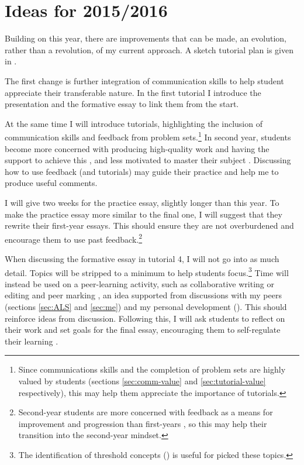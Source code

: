 \section{Ideas for 2015/2016}\label{sec:future}

Building on this year, there are improvements that can be made, an evolution, rather than a revolution, of my current approach. A sketch tutorial plan is given in .

The first change is further integration of communication skills to help student appreciate their transferable nature. In the first tutorial I introduce the presentation and the formative essay to link them from the start.

At the same time I will introduce tutorials, highlighting the inclusion of communication skills and feedback from problem sets.\footnote{Since communications skills and the completion of problem sets are highly valued by students (sections \ref{sec:comm-value} and \ref{sec:tutorial-value} respectively), this may help them appreciate the importance of tutorials.} In second year, students become more concerned with producing high-quality work and having the support to achieve this \citep{Zaitseva2013}, and less motivated to master their subject \citep{Lieberman2007}. Discussing how to use feedback (and tutorials) may guide their practice and help me to produce useful comments.

I will give two weeks for the practice essay, slightly longer than this year. To make the practice essay more similar to the final one, I will suggest that they rewrite their first-year essays. This should ensure they are not overburdened and encourage them to use past feedback.\footnote{Second-year students are more concerned with feedback as a means for improvement and progression than first-years \citep{Zaitseva2013}, so this may help their transition into the second-year mindset.}

When discussing the formative essay in tutorial 4, I will not go into as much detail. Topics will be stripped to a minimum to help students focus.\footnote{The identification of threshold concepts () is useful for picked these topics.} Time will instead be used on a peer-learning activity, such as collaborative writing or editing and peer marking \citep[chapter 1]{Falchikov2001}, an idea supported from discussions with my peers (sections \ref{sec:ALS} and \ref{sec:me}) and my personal development (). This should reinforce ideas from discussion. Following this, I will ask students to reflect on their work and set goals for the final essay, encouraging them to self-regulate their learning \citep{Nicol2006}.

